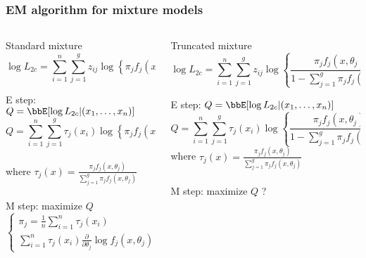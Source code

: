 \documentclass{beamer}
\begin{document}
\begin{frame}[shrink=14]\frametitle{EM algorithm for mixture models}

\begin{columns}[t]
 \begin{column}{0.45\textwidth}
Standard mixture
\[ \log L_{2c} = \sum_{i=1}^{n} \sum_{j=1}^g z_{ij} \log \left\{ \pi_j f_j \left(x,\theta_j \right) \right\} \]

E step: $Q = \bbE[ \log L_{2c} | (x_1,\ldots,x_n) ]$ 
\[Q = \sum_{i=1}^{n} \sum_{j=1}^g \tau_{j}(x_i) \log \left\{ \pi_j f_j \left(x,\theta_j \right) \right\}\] \\
where $\tau_j(x) = \frac{\pi_j f_j(x,\theta_j)}{\sum_{j=1}^g \pi_j f_j(x,\theta_j) }$ \\
\hfill \\
M step: maximize $Q$ \\
$ \begin{cases}
  \pi_j = \frac{1}{n} \sum_{i=1}^{n} \tau_j(x_i) \\
  \sum_{i=1}^{n} \tau_j(x_i) \frac{\partial}{\partial \theta_j} \log f_j(x,\theta_j) = 0
 \end{cases}
$
 \end{column}
\pause
 \begin{column}{0.55\textwidth}
Truncated mixture
\[ \log L_{2c} = \sum_{i=1}^{n} \sum_{j=1}^g z_{ij} \log \left\{ \frac{ \pi_j f_j \left(x,\theta_j \right)}{1-\sum_{j=1}^g \pi_j f_j(0,\theta_j)} \right\} \]

E step: $Q = \bbE[ \log L_{2c} | (x_1,\ldots,x_n) ]$ 
\[ Q = \sum_{i=1}^{n} \sum_{j=1}^g \tau_{j}(x_i) \log \left\{ \frac{ \pi_j f_j \left(x,\theta_j \right)}{1-\sum_{j=1}^g \pi_j f_j(0,\theta_j)} \right\} \]
where $\tau_j(x) = \frac{\pi_j f_j(x,\theta_j)}{\sum_{j=1}^g \pi_j f_j(x,\theta_j) }$ \\
\hfill \\
M step: maximize $Q$ ?

 \end{column}
\end{columns}
\end{frame}
\end{document}
